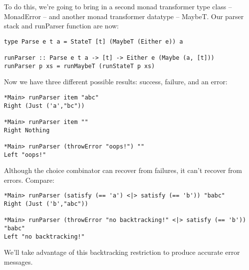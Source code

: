 \documentclass{tmr}
\begin{document}
To do this, we're going to bring in a second monad transformer type class -- MonadError -- and
another monad transformer datatype -- MaybeT.  Our parser stack and runParser function are now:
\begin{verbatim}
type Parse e t a = StateT [t] (MaybeT (Either e)) a

runParser :: Parse e t a -> [t] -> Either e (Maybe (a, [t]))
runParser p xs = runMaybeT (runStateT p xs)
\end{verbatim}
Now we have three different possible results:  success, failure, and an error:
\begin{verbatim}
*Main> runParser item "abc"
Right (Just ('a',"bc"))

*Main> runParser item ""
Right Nothing

*Main> runParser (throwError "oops!") ""
Left "oops!"
\end{verbatim}
Although the choice combinator can recover from failures, it can't recover from
errors.  Compare:
\begin{verbatim}
*Main> runParser (satisfy (== 'a') <|> satisfy (== 'b')) "babc"
Right (Just ('b',"abc"))

*Main> runParser (throwError "no backtracking!" <|> satisfy (== 'b')) "babc"
Left "no backtracking!"
\end{verbatim}
We'll take advantage of this backtracking restriction to produce accurate error
messages.
\end{document}
